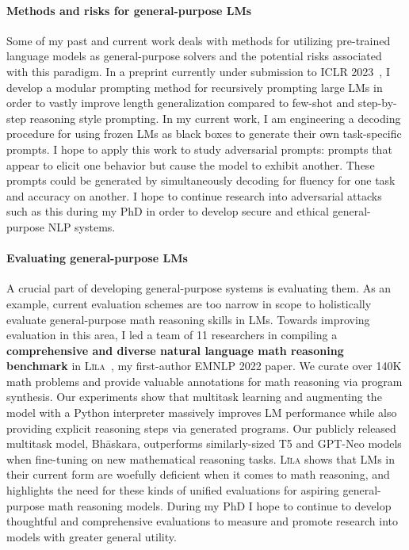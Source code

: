 \documentclass[11pt]{article}
\newcommand\lila{\textsc{L\={\i}la}\xspace}
\begin{document}
\paragraph{Methods and risks for general-purpose LMs}

Some of my past and current work 
deals with methods for utilizing pre-trained language models
as general-purpose solvers and the potential risks associated with this paradigm.
In a preprint currently under submission to ICLR 2023~\cite{Khot2022DecomposedPA},
I develop a modular prompting method for recursively prompting large LMs 
in order to vastly improve length generalization 
compared to few-shot and step-by-step reasoning style prompting.
In my current work, I am engineering a
decoding procedure for using frozen LMs as black boxes
to generate their own task-specific prompts.
I hope to apply this work
to study adversarial prompts:
prompts that appear to elicit one behavior 
but cause the model to exhibit another.
These prompts could be generated by simultaneously 
decoding for fluency for one task and accuracy on another.
I hope to continue research into adversarial attacks such as this 
during my PhD in order to
develop secure and ethical general-purpose NLP systems. 

\paragraph{Evaluating general-purpose LMs}
A crucial part of developing general-purpose systems is evaluating them.
As an example, 
current evaluation schemes are too narrow in scope to holistically evaluate 
general-purpose math reasoning skills in LMs.
Towards improving evaluation in this area, 
I led a team of 11 researchers in compiling a
\textbf{comprehensive and diverse natural language math reasoning benchmark} 
in \lila~\cite{Mishra2022Lila}, 
my first-author EMNLP 2022 paper.
We curate over 140K math problems
and provide valuable annotations for math reasoning via program synthesis. 
Our experiments show that multitask learning 
and augmenting the model with a Python interpreter
massively improves LM performance 
while also providing explicit reasoning steps via generated programs.
Our publicly released multitask model, Bh\=askara, 
outperforms similarly-sized T5 and GPT-Neo models
when fine-tuning on new mathematical reasoning tasks.
\lila shows that LMs 
in their current form 
are woefully deficient when it comes to math reasoning,
and highlights the need for these kinds of unified evaluations for 
aspiring general-purpose math reasoning models.
During my PhD I hope to continue to develop thoughtful and comprehensive evaluations 
to measure and promote research into models with greater general utility.
\end{document}
